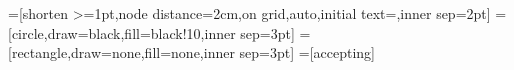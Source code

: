\def\caixa#1{\medskip
  \begin{center}
  \fbox{\begin{minipage}{0.9\textwidth}\protect{#1}\end{minipage}}
  \end{center}}

\usetikzlibrary{%
  positioning
 ,patterns
 ,arrows
 ,arrows.meta
 ,automata
 ,calc
 ,shapes
 ,fit
 ,tikzmark
 ,fadings
 ,decorations.pathreplacing
 ,plotmarks
 ,decorations.markings
}
=[shorten >=1pt,node distance=2cm,on grid,auto,initial text={},inner sep=2pt]
=[circle,draw=black,fill=black!10,inner sep=3pt]
=[rectangle,draw=none,fill=none,inner sep=3pt]
=[accepting]






